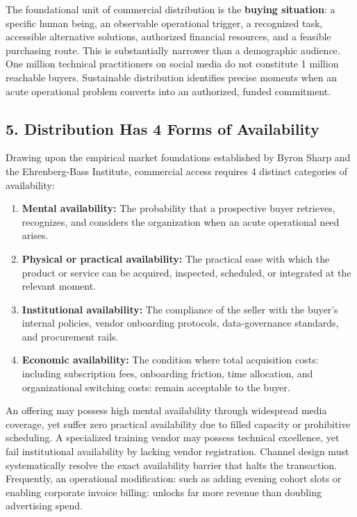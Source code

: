 The foundational unit of commercial distribution is the \textbf{buying situation}: a specific human being, an observable operational trigger, a recognized task, accessible alternative solutions, authorized financial resources, and a feasible purchasing route. This is substantially narrower than a demographic audience. One million technical practitioners on social media do not constitute 1 million reachable buyers. Sustainable distribution identifies precise moments when an acute operational problem converts into an authorized, funded commitment.

\subsection*{5. Distribution Has 4 Forms of Availability}

Drawing upon the empirical market foundations established by Byron Sharp and the Ehrenberg-Bass Institute, commercial access requires 4 distinct categories of availability:
\begin{enumerate}[leftmargin=*,itemsep=1pt]
  \item \textbf{Mental availability:} The probability that a prospective buyer retrieves, recognizes, and considers the organization when an acute operational need arises.
  \item \textbf{Physical or practical availability:} The practical ease with which the product or service can be acquired, inspected, scheduled, or integrated at the relevant moment.
  \item \textbf{Institutional availability:} The compliance of the seller with the buyer's internal policies, vendor onboarding protocols, data-governance standards, and procurement rails.
  \item \textbf{Economic availability:} The condition where total acquisition costs: including subscription fees, onboarding friction, time allocation, and organizational switching costs: remain acceptable to the buyer.
\end{enumerate}

An offering may possess high mental availability through widespread media coverage, yet suffer zero practical availability due to filled capacity or prohibitive scheduling. A specialized training vendor may possess technical excellence, yet fail institutional availability by lacking vendor registration. Channel design must systematically resolve the exact availability barrier that halts the transaction. Frequently, an operational modification: such as adding evening cohort slots or enabling corporate invoice billing: unlocks far more revenue than doubling advertising spend.

